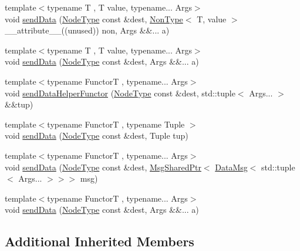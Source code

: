 \begin{DoxyCompactItemize}
\item 
{\footnotesize template$<$typename T , T value, typename... Args$>$ }\\void \hyperlink{structvt_1_1param_1_1_param_ac71ae9da515916042649b9c6074cbdf3}{send\+Data} (\hyperlink{namespacevt_a866da9d0efc19c0a1ce79e9e492f47e2}{Node\+Type} const \&dest, \hyperlink{structvt_1_1param_1_1_non_type}{Non\+Type}$<$ T, value $>$ \+\_\+\+\_\+attribute\+\_\+\+\_\+((unused)) non, Args \&\&... a)
\item 
{\footnotesize template$<$typename T , T value, typename... Args$>$ }\\void \hyperlink{structvt_1_1param_1_1_param_ae748b6bd022c33e842a83a50865454be}{send\+Data} (\hyperlink{namespacevt_a866da9d0efc19c0a1ce79e9e492f47e2}{Node\+Type} const \&dest, Args \&\&... a)
\item 
{\footnotesize template$<$typename FunctorT , typename... Args$>$ }\\void \hyperlink{structvt_1_1param_1_1_param_a51452ecb0d885e4a3755df33657d613e}{send\+Data\+Helper\+Functor} (\hyperlink{namespacevt_a866da9d0efc19c0a1ce79e9e492f47e2}{Node\+Type} const \&dest, std\+::tuple$<$ Args... $>$ \&\&tup)
\item 
{\footnotesize template$<$typename FunctorT , typename Tuple $>$ }\\void \hyperlink{structvt_1_1param_1_1_param_ad7524b5a6d2609de674fe4040d2fb90d}{send\+Data} (\hyperlink{namespacevt_a866da9d0efc19c0a1ce79e9e492f47e2}{Node\+Type} const \&dest, Tuple tup)
\item 
{\footnotesize template$<$typename FunctorT , typename... Args$>$ }\\void \hyperlink{structvt_1_1param_1_1_param_aa2405fed990331c40b9f8e05e8649a26}{send\+Data} (\hyperlink{namespacevt_a866da9d0efc19c0a1ce79e9e492f47e2}{Node\+Type} const \&dest, \hyperlink{namespacevt_ab2b3d506ec8e8d1540aede826d84a239}{Msg\+Shared\+Ptr}$<$ \hyperlink{structvt_1_1param_1_1_data_msg}{Data\+Msg}$<$ std\+::tuple$<$ Args... $>$$>$$>$ msg)
\item 
{\footnotesize template$<$typename FunctorT , typename... Args$>$ }\\void \hyperlink{structvt_1_1param_1_1_param_a706146de8f6eab423f7e5c7872587519}{send\+Data} (\hyperlink{namespacevt_a866da9d0efc19c0a1ce79e9e492f47e2}{Node\+Type} const \&dest, Args \&\&... a)
\end{DoxyCompactItemize}
\subsection*{Additional Inherited Members}



